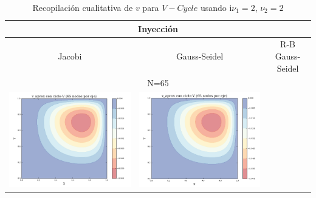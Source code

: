 \documentclass[letter,10pt]{article}
\begin{document}
\begin{table}[H]
\centering
\caption{Recopilación cualitativa de $v$ para $V-Cycle$ usando i$\nu_1=2$, $\nu_2=2$}
\begin{tabular}[t]{|c|c|c|}
\hline
\multicolumn{3}{|c|}{Inyección} \\ \hline
Jacobi & Gauss-Seidel & R-B Gauss-Seidel \\ \hline
\multicolumn{3}{|c|}{N=65} \\ \hline 
\includegraphics[scale=0.34]{img/v_cvjacobi65Ninjection} &
\includegraphics[scale=0.34]{img/v_cvGS65Ninjection} &

\end{tabular}
\end{table}
\end{document}
